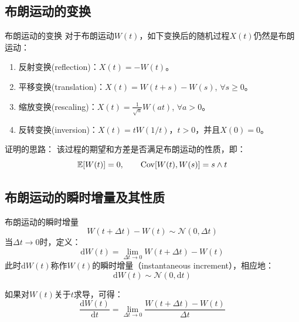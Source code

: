 \documentclass[t]{beamer}
\newcommand{\E}{\mathbb{E}}
\begin{document}
\subsection{布朗运动的变换}
\begin{frame}{布朗运动的变换}
  对于布朗运动$W(t)$，如下变换后的随机过程$X(t)$仍然是布朗运动：
  \begin{enumerate}
    \item 反射变换(reflection)：$X(t)=-W(t)$。
    \item 平移变换(translation)：$X(t)=W(t+s)-W(s)$, $\forall s\ge 0$。
    \item 缩放变换(rescaling)：$X(t)=\displaystyle\frac{1}{\sqrt{a}}W(at)$,  $\forall a>0$。
    \item 反转变换(inversion)：$X(t)=tW(1/t)$，$t>0$，并且$X(0)=0$。
  \end{enumerate}

\begin{block}{证明的思路：}
该过程的期望和方差是否满足布朗运动的性质，即：
\begin{equation*}
\E [W(t)]=0,\qquad {\rm Cov}[W(t), W(s)]=s\wedge t
\end{equation*}
\end{block}

\end{frame}

\subsection{布朗运动的瞬时增量及其性质}
\begin{frame}{布朗运动的瞬时增量}
  \[W(t+\Delta t)-W(t) \sim \mathcal{N}(0, \Delta t)\]
  当$\Delta t\to 0$时，定义：
  \[\mathrm{d} W(t)=\lim _{\Delta t \rightarrow 0} {W(t+\Delta t)-W(t)}\]
  此时$\mathrm{d} W(t)$称作$W(t)$的瞬时增量（instantaneous increment），相应地：
  \[\mathrm{d} W(t) \sim \mathcal{N}(0, \mathrm{d} t)\]  
  
  如果对$ W(t) $关于$t$求导，可得：
  \begin{equation*}
  \frac{\mathrm{d} W(t)}{\mathrm{d} t}=\lim_{\Delta t \rightarrow 0}\frac{W(t+\Delta t)-W(t)}{\Delta t}
  \end{equation*}
\end{frame}
\end{document}
